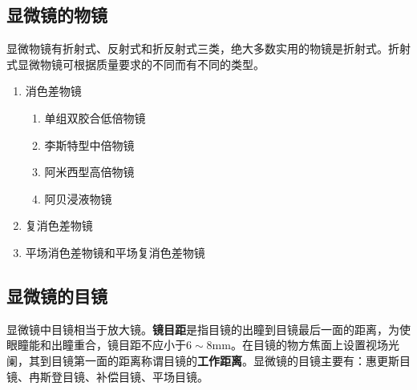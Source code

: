 \documentclass[cn,10pt,chinesefont=founder,math=newtx,cite=super,twoside]{elegantbook}
\begin{document}
\subsection{显微镜的物镜}

显微物镜有折射式、反射式和折反射式三类，绝大多数实用的物镜是折射式。折射式显微物镜可根据质量要求的不同而有不同的类型。
\begin{enumerate}
	\item 消色差物镜
	\begin{enumerate}
		\item 单组双胶合低倍物镜
		\item 李斯特型中倍物镜
		\item 阿米西型高倍物镜
		\item 阿贝浸液物镜
	\end{enumerate}
	\item 复消色差物镜
	\item 平场消色差物镜和平场复消色差物镜
\end{enumerate}

\subsection{显微镜的目镜}
显微镜中目镜相当于放大镜。\textbf{镜目距}是指目镜的出瞳到目镜最后一面的距离，为使眼瞳能和出瞳重合，镜目距不应小于$6\sim8\mathrm{mm}$。在目镜的物方焦面上设置视场光阑，其到目镜第一面的距离称谓目镜的\textbf{工作距离}。显微镜的目镜主要有：惠更斯目镜、冉斯登目镜、补偿目镜、平场目镜。
\end{document}
